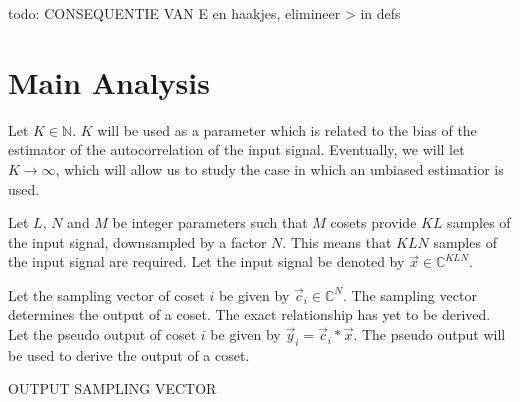 \documentclass[a4paper, openany, oneside]{memoir}
\begin{document}
todo: CONSEQUENTIE VAN E en haakjes, elimineer > in defs
\section{Main Analysis}
Let $K \in \mathbb{N}$. $K$ will be used as a parameter which is related to the bias of the estimator of the autocorrelation of the input signal. Eventually, we will let $K \to \infty$, which will allow us to study the case in which an unbiased estimatior is used.

Let $L$, $N$ and $M$ be integer parameters such that $M$ cosets provide $KL$ samples of the input signal, downsampled by a factor $N$. This means that $KLN$ samples of the input signal are required. Let the input signal be denoted by $\vec{x} \in \mathbb{C}^{KLN}$.

Let the sampling vector of coset $i$ be given by $\vec{c}_i \in \mathbb{C}^{N}$. The sampling vector determines the output of a coset. The exact relationship has yet to be derived. Let the pseudo output of coset $i$ be given by $\vec{y}_i = \vec{c}_i \ast \vec{x}$. The pseudo output will be used to derive the output of a coset.


OUTPUT SAMPLING VECTOR

\begin{blockTheorem} \label{th:conv-corr}
     \nolinebreak
\end{blockTheorem}
\end{document}
